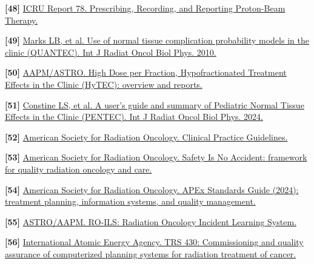 \documentclass[11pt,letterpaper]{article}
\begin{document}
\textbf{[48] }\href{\detokenize{https://www.icru.org/report/prescribing-recording-and-reporting-proton-beam-therapy-icru-report-78/}}{ICRU Report 78. Prescribing, Recording, and Reporting Proton-Beam Therapy.}

\textbf{[49] }\href{\detokenize{https://pubmed.ncbi.nlm.nih.gov/20171502/}}{Marks LB, et al. Use of normal tissue complication probability models in the clinic (QUANTEC). Int J Radiat Oncol Biol Phys. 2010.}

\textbf{[50] }\href{\detokenize{https://www.aapm.org/pubs/HyTEC/}}{AAPM\slash\allowbreak{}ASTRO. High Dose per Fraction, Hypofractionated Treatment Effects in the Clinic (HyTEC): overview and reports.}

\textbf{[51] }\href{\detokenize{https://pubmed.ncbi.nlm.nih.gov/37999712/}}{Constine LS, et al. A user's guide and summary of Pediatric Normal Tissue Effects in the Clinic (PENTEC). Int J Radiat Oncol Biol Phys. 2024.}

\textbf{[52] }\href{\detokenize{https://www.astro.org/provider-resources/guidelines/clinical-practice-guidelines}}{American Society for Radiation Oncology. Clinical Practice Guidelines.}

\textbf{[53] }\href{\detokenize{https://www.astro.org/practice-support/quality-and-safety/safety-is-no-accident}}{American Society for Radiation Oncology. Safety Is No Accident: framework for quality radiation oncology and care.}

\textbf{[54] }\href{\detokenize{https://www.astro.org/getmedia/d6ee884d-eb5b-4af6-85f6-c27e2aa6439e/APExStandards.pdf}}{American Society for Radiation Oncology. APEx Standards Guide (2024): treatment planning, information systems, and quality management.}

\textbf{[55] }\href{\detokenize{https://www.astro.org/practice-support/quality-and-safety/ro-ils}}{ASTRO\slash\allowbreak{}AAPM. RO-ILS: Radiation Oncology Incident Learning System.}

\textbf{[56] }\href{\detokenize{https://www-pub.iaea.org/MTCD/Publications/PDF/TRS430_web.pdf}}{International Atomic Energy Agency. TRS 430: Commissioning and quality assurance of computerized planning systems for radiation treatment of cancer.}
\end{document}
